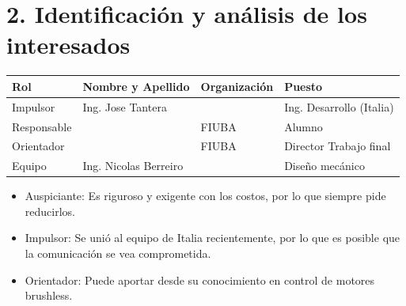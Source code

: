 \documentclass[
11pt, %
codirector, %
]{charter}
\begin{document}
\vspace{25px}

\section{2. Identificación y análisis de los interesados}
\label{sec:interesados}


\begin{table}[ht]
	\begin{tabularx}{\linewidth}{@{}|l|X|X|l|@{}}
		\hline
		\rowcolor[HTML]{C0C0C0}
		Rol         & Nombre y Apellido     & Organización    & Puesto                   \\ \hline
		Impulsor    & Ing. Jose Tantera     & \empclientename & Ing. Desarrollo (Italia) \\ \hline
		Responsable & \authorname           & FIUBA           & Alumno                   \\ \hline
		Orientador  & \supname              & FIUBA           & Director Trabajo final   \\ \hline
		Equipo      & Ing. Nicolas Berreiro & \empclientename & Diseño mecánico          \\ \hline
	\end{tabularx}
\end{table}

\begin{itemize}
	\item Auspiciante: Es riguroso y exigente con los costos, por lo que siempre pide reducirlos.
	\item Impulsor: Se unió al equipo de Italia recientemente, por lo que es posible que la comunicación se vea comprometida.
	\item Orientador: Puede aportar desde su conocimiento en control de motores brushless.
\end{itemize}
\end{document}
